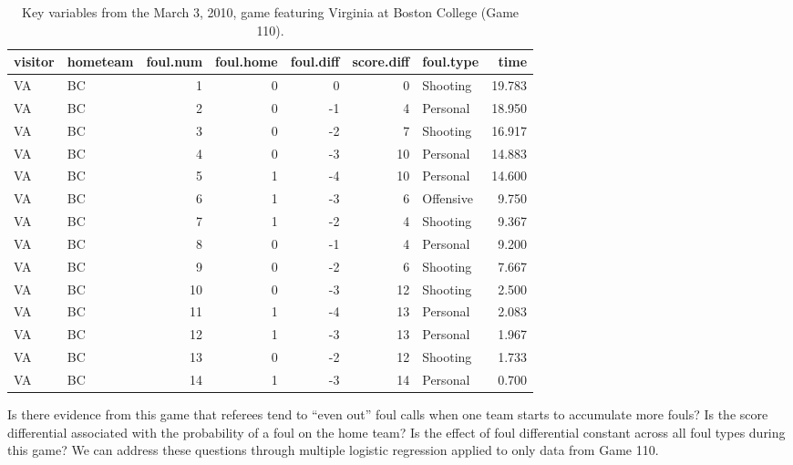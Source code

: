 \documentclass[
]{krantz}
\begin{document}
\begin{table}[t]

\caption{\label{tab:table3chp11}Key variables from the March 3, 2010, game featuring Virginia at Boston College (Game 110).}
\centering
\begin{tabular}{llrrrrlr}
\toprule
visitor & hometeam & foul.num & foul.home & foul.diff & score.diff & foul.type & time\\
\midrule
VA & BC & 1 & 0 & 0 & 0 & Shooting & 19.783\\
VA & BC & 2 & 0 & -1 & 4 & Personal & 18.950\\
VA & BC & 3 & 0 & -2 & 7 & Shooting & 16.917\\
VA & BC & 4 & 0 & -3 & 10 & Personal & 14.883\\
VA & BC & 5 & 1 & -4 & 10 & Personal & 14.600\\
\addlinespace
VA & BC & 6 & 1 & -3 & 6 & Offensive & 9.750\\
VA & BC & 7 & 1 & -2 & 4 & Shooting & 9.367\\
VA & BC & 8 & 0 & -1 & 4 & Personal & 9.200\\
VA & BC & 9 & 0 & -2 & 6 & Shooting & 7.667\\
VA & BC & 10 & 0 & -3 & 12 & Shooting & 2.500\\
\addlinespace
VA & BC & 11 & 1 & -4 & 13 & Personal & 2.083\\
VA & BC & 12 & 1 & -3 & 13 & Personal & 1.967\\
VA & BC & 13 & 0 & -2 & 12 & Shooting & 1.733\\
VA & BC & 14 & 1 & -3 & 14 & Personal & 0.700\\
\bottomrule
\end{tabular}
\end{table}

Is there evidence from this game that referees tend to ``even out'' foul calls when one team starts to accumulate more fouls? Is the score differential associated with the probability of a foul on the home team? Is the effect of foul differential constant across all foul types during this game? We can address these questions through multiple logistic regression applied to only data from Game 110.
\end{document}
